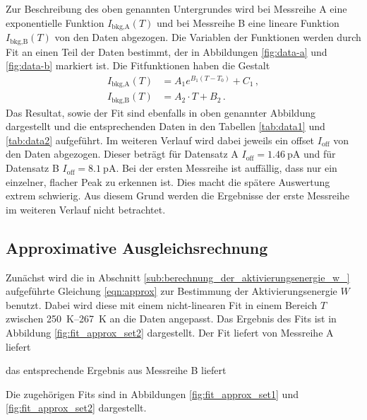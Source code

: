 Zur Beschreibung des oben genannten Untergrundes wird bei Messreihe A eine
exponentielle Funktion $I_\text{bkg,A}(T)$ und bei Messreihe B eine lineare
Funktion
$I_\text{bkg,B}(T)$ von den Daten abgezogen. Die Variablen der Funktionen werden
durch Fit an einen Teil der Daten bestimmt, der in Abbildungen
\ref{fig:data-a} und \ref{fig:data-b} markiert ist.
Die Fitfunktionen haben die Gestalt
\begin{align*}
    I_\text{bkg,A}(T) &= A_1 e^{B_1 (T-T_0)} + C_1\,,\\
    I_\text{bkg,B}(T) &= A_2\cdot T + B_2\,.
\end{align*}
Das Resultat, sowie der Fit sind ebenfalls in oben genannter Abbildung
dargestellt und die entsprechenden Daten in den Tabellen \ref{tab:data1} und
\ref{tab:data2} aufgeführt.
Im weiteren Verlauf wird dabei jeweils ein offset $I_\text{off}$ von den Daten
abgezogen. Dieser beträgt für Datensatz A $I_\text{off} = \SI{1.46}{\pico\ampere}$
und für Datensatz B $I_\text{off} = \SI{8.1}{\pico\ampere}$.
Bei der ersten Messreihe ist auffällig, dass nur ein einzelner, flacher Peak
zu erkennen ist. Dies macht die spätere Auswertung extrem schwierig.
Aus diesem Grund werden die Ergebnisse der erste Messreihe im weiteren
Verlauf nicht betrachtet.

\subsection{Approximative Ausgleichsrechnung}
\label{subsec:approx}
Zunächst wird die in Abschnitt \ref{sub:berechnung_der_aktivierungsenergie_w_}
aufgeführte Gleichung \ref{eqn:approx} zur Bestimmung der Aktivierungsenergie
$W$ benutzt. Dabei wird diese mit einem nicht-linearen Fit in einem Bereich
$T$ zwischen \SIrange{250}{267}{\kelvin} an die Daten angepasst.
Das Ergebnis des Fits ist in Abbildung \ref{fig:fit_approx_set2} dargestellt.
Der Fit liefert von Messreihe A liefert



das entsprechende Ergebnis aus Messreihe B liefert



Die zugehörigen Fits sind in Abbildungen \ref{fig:fit_approx_set1}
und \ref{fig:fit_approx_set2} dargestellt.

